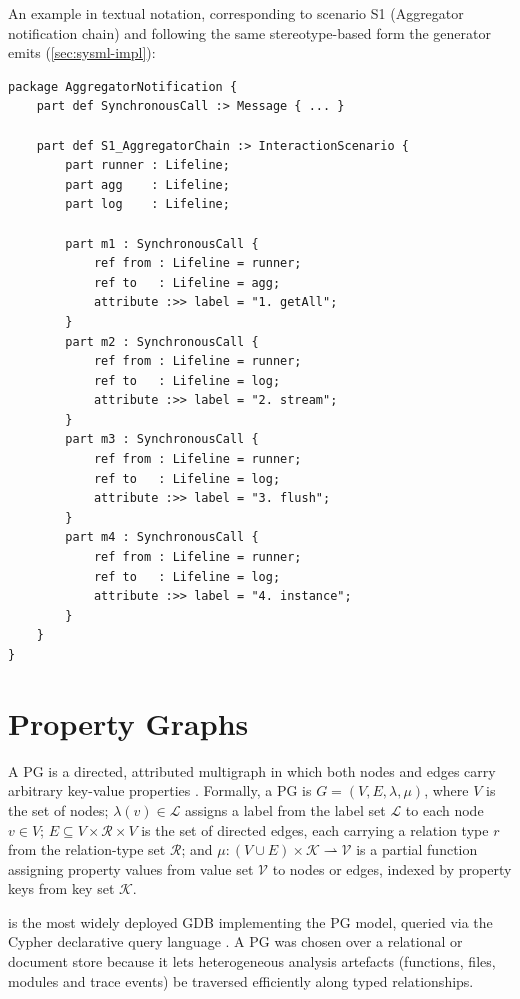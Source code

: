 An example in \sysml textual notation, corresponding to scenario S1
(Aggregator notification chain) and following the same stereotype-based
form the generator emits (\cref{sec:sysml-impl}):

\begin{verbatim}
package AggregatorNotification {
    part def SynchronousCall :> Message { ... }

    part def S1_AggregatorChain :> InteractionScenario {
        part runner : Lifeline;
        part agg    : Lifeline;
        part log    : Lifeline;

        part m1 : SynchronousCall {
            ref from : Lifeline = runner;
            ref to   : Lifeline = agg;
            attribute :>> label = "1. getAll";
        }
        part m2 : SynchronousCall {
            ref from : Lifeline = runner;
            ref to   : Lifeline = log;
            attribute :>> label = "2. stream";
        }
        part m3 : SynchronousCall {
            ref from : Lifeline = runner;
            ref to   : Lifeline = log;
            attribute :>> label = "3. flush";
        }
        part m4 : SynchronousCall {
            ref from : Lifeline = runner;
            ref to   : Lifeline = log;
            attribute :>> label = "4. instance";
        }
    }
}
\end{verbatim}

\section{Property Graphs}\label{sec:property-graphs}

A \acl{PG} is a directed, attributed multigraph in which both nodes and
edges carry arbitrary key-value properties \cite{angles:pg-survey}.
Formally, a \ac{PG} is $G = (V, E, \lambda, \mu)$, where $V$ is the set
of nodes; $\lambda(v) \in \mathcal{L}$ assigns a label from the label set
$\mathcal{L}$ to each node $v \in V$; $E \subseteq V \times \mathcal{R}
\times V$ is the set of directed edges, each carrying a relation type $r$
from the relation-type set $\mathcal{R}$; and $\mu : (V \cup E) \times
\mathcal{K} \rightharpoonup \mathcal{V}$ is a partial function assigning
property values from value set $\mathcal{V}$ to nodes or edges, indexed
by property keys from key set $\mathcal{K}$.

\neo is the most widely deployed \ac{GDB} implementing the \ac{PG} model,
queried via the Cypher declarative query language \cite{neo4j:cypher}. A
\ac{PG} was chosen over a relational or document store because it lets
heterogeneous analysis artefacts (functions, files, modules and trace
events) be traversed efficiently along typed relationships.

